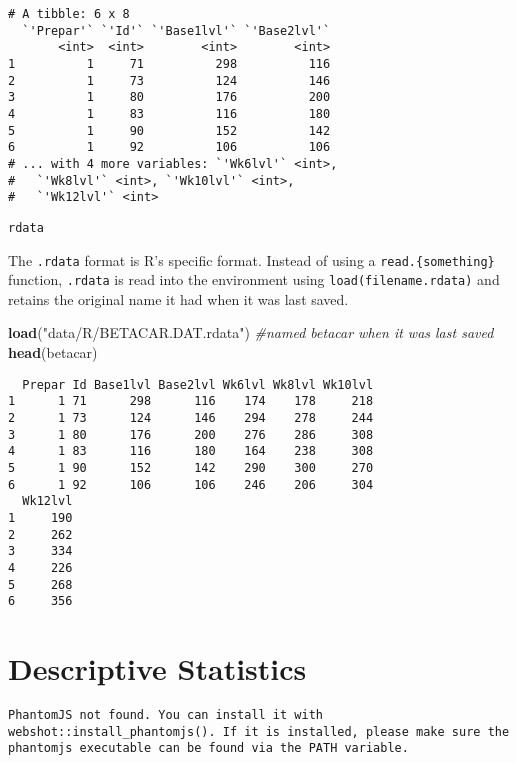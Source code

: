 \documentclass[12pt,]{article}
\newenvironment{Shaded}{\begin{snugshade}}{\end{snugshade}}
\newcommand{\KeywordTok}[1]{\textcolor[rgb]{0.13,0.29,0.53}{\textbf{#1}}}
\newcommand{\StringTok}[1]{\textcolor[rgb]{0.31,0.60,0.02}{#1}}
\newcommand{\CommentTok}[1]{\textcolor[rgb]{0.56,0.35,0.01}{\textit{#1}}}
\newcommand{\NormalTok}[1]{#1}
\theoremstyle{definition}
\theoremstyle{definition}
\theoremstyle{definition}
\theoremstyle{remark}
\begin{document}
\begin{verbatim}
# A tibble: 6 x 8
  `'Prepar'` `'Id'` `'Base1lvl'` `'Base2lvl'`
       <int>  <int>        <int>        <int>
1          1     71          298          116
2          1     73          124          146
3          1     80          176          200
4          1     83          116          180
5          1     90          152          142
6          1     92          106          106
# ... with 4 more variables: `'Wk6lvl'` <int>,
#   `'Wk8lvl'` <int>, `'Wk10lvl'` <int>,
#   `'Wk12lvl'` <int>
\end{verbatim}

\texttt{rdata}

The \texttt{.rdata} format is R's specific format. Instead of using a
\texttt{read.\{something\}} function, \texttt{.rdata} is read into the
environment using \texttt{load(filename.rdata)} and retains the original
name it had when it was last saved.

\begin{Shaded}
\begin{Highlighting}[]
\KeywordTok{load}\NormalTok{(}\StringTok{"data/R/BETACAR.DAT.rdata"}\NormalTok{)  }\CommentTok{#named betacar when it was last saved}
\KeywordTok{head}\NormalTok{(betacar)}
\end{Highlighting}
\end{Shaded}

\begin{verbatim}
  Prepar Id Base1lvl Base2lvl Wk6lvl Wk8lvl Wk10lvl
1      1 71      298      116    174    178     218
2      1 73      124      146    294    278     244
3      1 80      176      200    276    286     308
4      1 83      116      180    164    238     308
5      1 90      152      142    290    300     270
6      1 92      106      106    246    206     304
  Wk12lvl
1     190
2     262
3     334
4     226
5     268
6     356
\end{verbatim}

\section{Descriptive Statistics}\label{descriptive-statistics}

\begin{verbatim}
PhantomJS not found. You can install it with webshot::install_phantomjs(). If it is installed, please make sure the phantomjs executable can be found via the PATH variable.
\end{verbatim}
\end{document}
